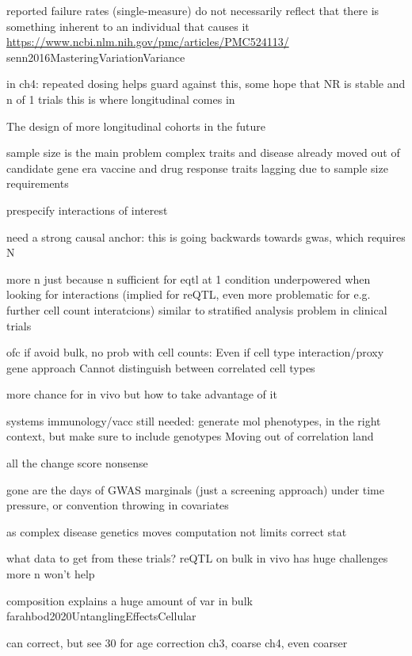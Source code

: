 \begin{outline}
            reported failure rates (single-measure) do not necessarily reflect that there is something inherent to an individual that causes it \url{https://www.ncbi.nlm.nih.gov/pmc/articles/PMC524113/} senn2016MasteringVariationVariance

                in ch4: repeated dosing helps guard against this, some hope that NR is stable
                and n of 1 trials
            this is where longitudinal comes in

The design of more longitudinal cohorts in the future

    sample size is the main problem
        complex traits and disease already moved out of candidate gene era
        vaccine and drug response traits lagging due to sample size requirements

        prespecify interactions of interest

    need a strong causal anchor: this is going backwards towards gwas, which requires N

    more n
        just because n sufficient for eqtl at 1 condition
        underpowered when looking for interactions (implied for reQTL, even more problematic for e.g. further cell count interatcions)
        similar to stratified analysis problem in clinical trials

    ofc if avoid bulk, no prob with cell counts:
        Even if cell type interaction/proxy gene approach
        Cannot distinguish between correlated cell types

    more chance for in vivo
        but how to take advantage of it

    systems immunology/vacc still needed: generate mol phenotypes, in the right context,
    but make sure to include genotypes
    Moving out of correlation land

    all the change score nonsense

    gone are the days of GWAS marginals (just a screening approach)
        under time pressure, or convention
        throwing in covariates

    as     complex disease genetics moves 
    computation not limits correct stat

what data to get from these trials?
reQTL on bulk in vivo has huge challenges
more n won't help

    composition explains a huge amount of var in bulk farahbod2020UntanglingEffectsCellular

    can correct, but see 30 for age correction
        ch3, coarse
        ch4, even coarser


\end{outline}
